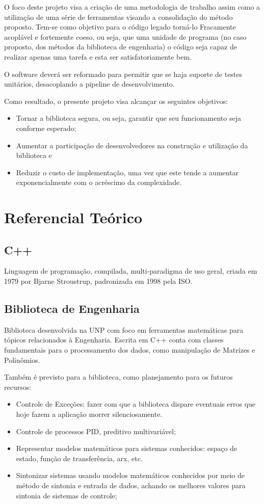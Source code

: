 \documentclass[
	article,			%
	12pt,				%
	oneside,			%
	a4paper,			%
	english,			
	brazil,
	sumario=tradicional
	]{abntex2}
\begin{document}
O foco deste projeto visa a criação de uma metodologia de trabalho assim como a utilização de uma série de ferramentas visando a consolidação do método proposto.
Tem-se como objetivo para o código legado torná-lo Fracamente acoplável e fortemente coeso, ou seja, que uma unidade de programa (no caso proposto, dos métodos da biblioteca de engenharia) o código seja capaz de realizar apenas uma tarefa e esta ser satisfatoriamente bem. 

O software deverá ser reformado para permitir que se haja suporte de testes unitários, desacoplando a pipeline de desenvolvimento.

Como resultado, o presente projeto visa alcançar os seguintes objetivos:
\begin{itemize}
	\item{Tornar a biblioteca segura, ou seja, garantir que seu funcionamento seja conforme esperado;}
	\item{Aumentar a participação de desenvolvedores na construção e utilização da biblioteca e}
	\item{Reduzir o custo de implementação, uma vez que este tende a aumentar exponencialmente com o acréscimo da complexidade.}
\end{itemize}

\pagebreak
\section{Referencial Teórico}


\subsection{C++}

Linguagem de programação, compilada, multi-paradigma de uso geral, criada em 1979 por Bjarne Stroustrup, padronizada em 1998 pela ISO.


\subsection{Biblioteca de Engenharia}

Biblioteca desenvolvida na UNP com foco em ferramentas matemáticas para tópicos relacionados à Engenharia. Escrita em C++ conta com classes fundamentais para o processamento dos dados, como manipulação de Matrizes e Polinômios. 

Também é previsto para a biblioteca, como planejamento para os futuros recursos:

\begin{itemize}
	\item{Controle de Exceções: fazer com que a biblioteca dispare eventuais erros que hoje fazem a aplicação morrer silenciosamente.}
	\item{Controle de processos PID, preditivo multivariável;}
	\item Representar modelos matemáticos para sistemas conhecidos: espaço de estado, função de transferência, arx, etc.
	\item Sintonizar sistemas usando modelos matemáticos conhecidos por meio de método de sintonia e entrada de dados, achando os melhores valores para sintonia de sistemas de controle;
\end{itemize}
\end{document}
